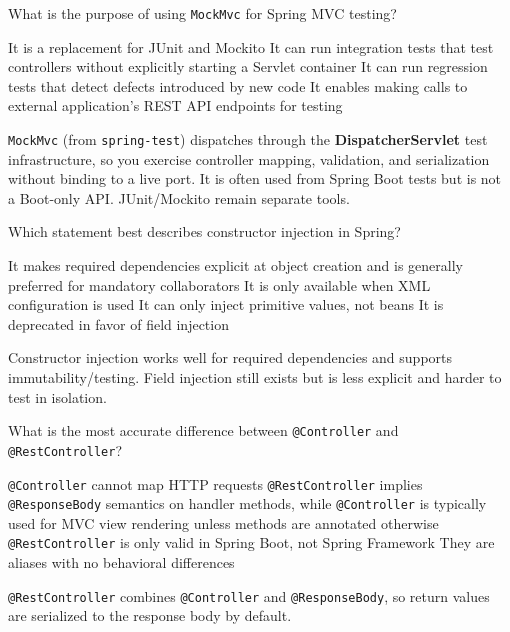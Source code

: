\question[4]
What is the purpose of using \texttt{MockMvc} for Spring MVC testing?
\begin{choices}
  \choice It is a replacement for JUnit and Mockito
  \CorrectChoice It can run integration tests that test controllers without explicitly starting a Servlet container
  \choice It can run regression tests that detect defects introduced by new code
  \choice It enables making calls to external application's REST API endpoints for testing
\end{choices}
\begin{solution}
  \texttt{MockMvc} (from \texttt{spring-test}) dispatches through the \textbf{DispatcherServlet} test infrastructure, so you exercise controller mapping, validation, and serialization without binding to a live port. It is often used from Spring Boot tests but is not a Boot-only API. JUnit/Mockito remain separate tools.
\end{solution}


\question[4]
Which statement best describes constructor injection in Spring?
\begin{choices}
  \CorrectChoice It makes required dependencies explicit at object creation and is generally preferred for mandatory collaborators
  \choice It is only available when XML configuration is used
  \choice It can only inject primitive values, not beans
  \choice It is deprecated in favor of field injection
\end{choices}
\begin{solution}
  Constructor injection works well for required dependencies and supports immutability/testing. Field injection still exists but is less explicit and harder to test in isolation.
\end{solution}

\question[4]
What is the most accurate difference between \texttt{@Controller} and \texttt{@RestController}?
\begin{choices}
  \choice \texttt{@Controller} cannot map HTTP requests
  \CorrectChoice \texttt{@RestController} implies \texttt{@ResponseBody} semantics on handler methods, while \texttt{@Controller} is typically used for MVC view rendering unless methods are annotated otherwise
  \choice \texttt{@RestController} is only valid in Spring Boot, not Spring Framework
  \choice They are aliases with no behavioral differences
\end{choices}
\begin{solution}
  \texttt{@RestController} combines \texttt{@Controller} and \texttt{@ResponseBody}, so return values are serialized to the response body by default.
\end{solution}

